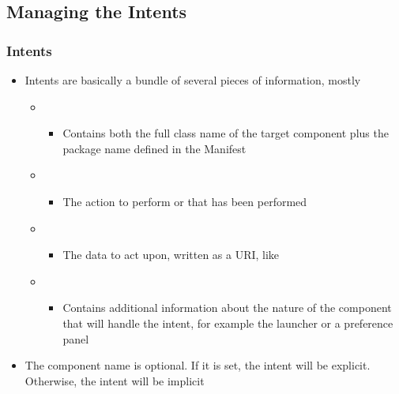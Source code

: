 \subsection{Managing the Intents}

\begin{frame}
  \frametitle{Intents}
  \begin{itemize}
  \item Intents are basically a bundle of several pieces of information,
    mostly
    \begin{itemize}
    \item {}
      \begin{itemize}
      \item Contains both the full class name of the target
        component plus the package name defined in the Manifest
      \end{itemize}
    \item {}
      \begin{itemize}
      \item The action to perform or that has been performed
      \end{itemize}
    \item {}
      \begin{itemize}
      \item The data to act upon, written as a URI, like
      \end{itemize}
    \item {}
      \begin{itemize}
      \item Contains additional information about the nature of the
        component that will handle the intent, for example the launcher
        or a preference panel
      \end{itemize}
    \end{itemize}
  \item The component name is optional. If it is set, the intent will
    be explicit. Otherwise, the intent will be implicit
  \end{itemize}
\end{frame}

